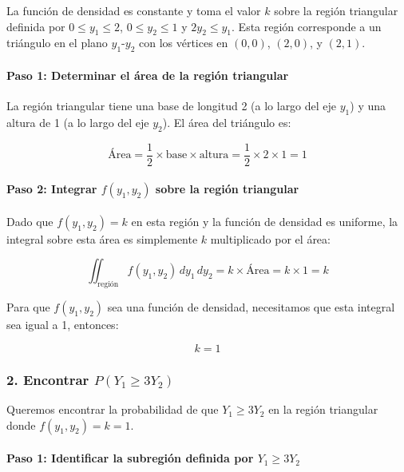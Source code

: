 \documentclass[
]{article}
\begin{document}
La función de densidad es constante y toma el valor \(k\) sobre la región triangular definida por \(0 \leq y_1 \leq 2\), \(0 \leq y_2 \leq 1\) y \(2 y_2 \leq y_1\). Esta región corresponde a un triángulo en el plano \(y_1\)-\(y_2\) con los vértices en \((0,0)\), \((2,0)\), y \((2,1)\).

\paragraph{Paso 1: Determinar el área de la región triangular}\label{paso-1-determinar-el-uxe1rea-de-la-regiuxf3n-triangular}

La región triangular tiene una base de longitud 2 (a lo largo del eje \(y_1\)) y una altura de 1 (a lo largo del eje \(y_2\)). El área del triángulo es:

\[
\text{Área} = \frac{1}{2} \times \text{base} \times \text{altura} = \frac{1}{2} \times 2 \times 1 = 1
\]

\paragraph{\texorpdfstring{Paso 2: Integrar \(f(y_1, y_2)\) sobre la región triangular}{Paso 2: Integrar f(y\_1, y\_2) sobre la región triangular}}\label{paso-2-integrar-fy_1-y_2-sobre-la-regiuxf3n-triangular}

Dado que \(f(y_1, y_2) = k\) en esta región y la función de densidad es uniforme, la integral sobre esta área es simplemente \(k\) multiplicado por el área:

\[
\iint_{\text{región}} f(y_1, y_2) \, dy_1 \, dy_2 = k \times \text{Área} = k \times 1 = k
\]

Para que \(f(y_1, y_2)\) sea una función de densidad, necesitamos que esta integral sea igual a 1, entonces:

\[
k = 1
\]

\subsubsection{\texorpdfstring{2. Encontrar \(P(Y_{1} \geq 3 Y_{2})\)}{2. Encontrar P(Y\_\{1\} \textbackslash geq 3 Y\_\{2\})}}\label{encontrar-py_1-geq-3-y_2}

Queremos encontrar la probabilidad de que \(Y_{1} \geq 3 Y_{2}\) en la región triangular donde \(f(y_1, y_2) = k = 1\).

\paragraph{\texorpdfstring{Paso 1: Identificar la subregión definida por \(Y_{1} \geq 3 Y_{2}\)}{Paso 1: Identificar la subregión definida por Y\_\{1\} \textbackslash geq 3 Y\_\{2\}}}\label{paso-1-identificar-la-subregiuxf3n-definida-por-y_1-geq-3-y_2}
\end{document}
